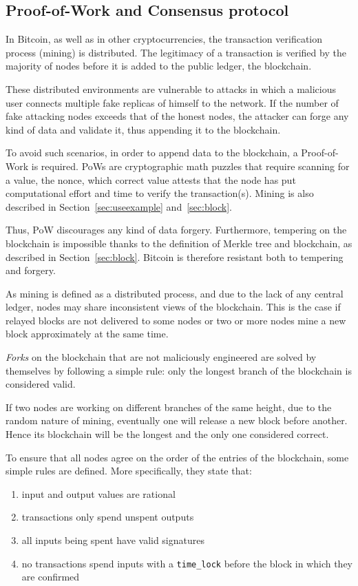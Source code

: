 \documentclass[12pt, letterpaper, twoside]{article}
\begin{document}
\subsection{Proof-of-Work and Consensus protocol}\label{sec:consensus}
In Bitcoin, as well as in other cryptocurrencies, the transaction verification process (mining) is distributed. The legitimacy of a transaction is verified by the majority of nodes before it is added to the public ledger, the blockchain.

These distributed environments are vulnerable to attacks in which a malicious user connects multiple fake replicas of himself to the network. If the number of fake attacking nodes exceeds that of the honest nodes, the attacker can forge any kind of data and validate it, thus appending it to the blockchain.

To avoid such scenarios, in order to append data to the blockchain, a Proof-of-Work is required. PoWs are cryptographic math puzzles that require scanning for a value, the nonce, which correct value attests that the node has put computational effort and time to verify the transaction(s). Mining is also described in Section~\ref{sec:useexample} and~\ref{sec:block}.

Thus, PoW discourages any kind of data forgery. Furthermore, tempering on the blockchain is impossible thanks to the definition of Merkle tree and blockchain, as described in Section~\ref{sec:block}. Bitcoin is therefore resistant both to tempering and forgery.

As mining is defined as a distributed process, and due to the lack of any central ledger, nodes may share inconsistent views of the blockchain. This is the case if relayed blocks are not delivered to some nodes or two or more nodes mine a new block approximately at the same time.

\emph{Forks} on the blockchain that are not maliciously engineered are solved by themselves by following a simple rule: only the longest branch of the blockchain is considered valid.

If two nodes are working on different branches of the same height, due to the random nature of mining, eventually one will release a new block before another. Hence its blockchain will be the longest and the only one considered correct.

To ensure that all nodes agree on the order of the entries of the blockchain, some simple rules are defined. More specifically, they state that:
\begin{enumerate}
	\item input and output values are rational
	\item transactions only spend unspent outputs
	\item all inputs being spent have valid signatures
	\item no transactions spend inputs with a \texttt{time\_lock} before the block in which they are confirmed
\end{enumerate} 
 
\end{document}
